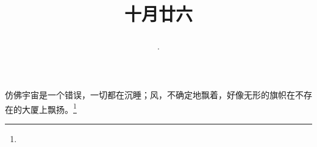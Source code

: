 \title{\date[d=26,m=11,y=2024][year:cn-y,年,month:cn,day:cn,日,·,weekday]·十月廿六 }
仿佛宇宙是一个错误，一切都在沉睡；风，不确定地飘着，好像无形的旗帜在不存在的大厦上飘扬。\footnote{ }

